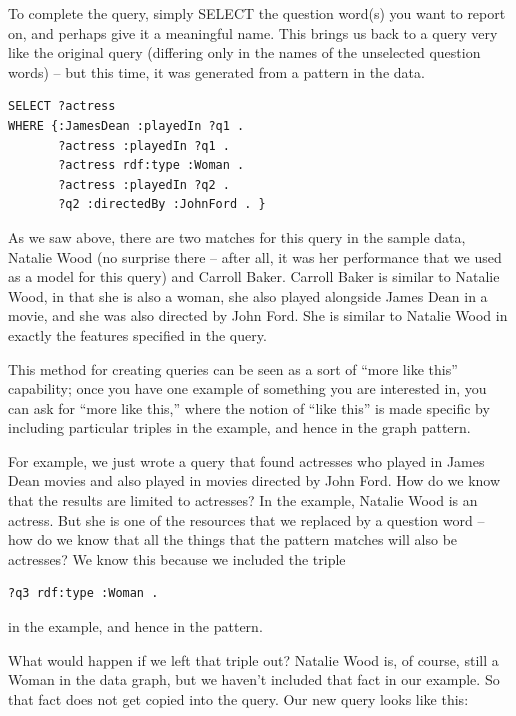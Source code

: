 To complete the query, simply SELECT the question word(s) you want to
report on, and perhaps give it a meaningful name. This brings us back to
a query very like the original query (differing only in the names of the
unselected question words) -- but this time, it was generated from a
pattern in the data.

\begin{lstlisting}
SELECT ?actress
WHERE {:JamesDean :playedIn ?q1 .
       ?actress :playedIn ?q1 .
       ?actress rdf:type :Woman .
       ?actress :playedIn ?q2 .
       ?q2 :directedBy :JohnFord . }
\end{lstlisting}


As we saw above, there are two matches for this query in the sample
data, Natalie Wood (no surprise there -- after all, it was her
performance that we used as a model for this query) and Carroll Baker.
Carroll Baker is similar to Natalie Wood, in that she is also a woman,
she also played alongside James Dean in a movie, and she was also
directed by John Ford. She is similar to Natalie Wood in exactly the
features specified in the query.

This method for creating queries can be seen as a sort of ``more like
this'' capability; once you have one example of something you are
interested in, you can ask for ``more like this,'' where the notion of
``like this'' is made specific by including particular triples in the
example, and hence in the graph pattern.

For example, we just wrote a query that found actresses who played in
James Dean movies and also played in movies directed by John Ford. How
do we know that the results are limited to actresses? In the example,
Natalie Wood is an actress. But she is one of the resources that we
replaced by a question word -- how do we know that all the things that
the pattern matches will also be actresses? We know this because we
included the triple

\begin{lstlisting}
?q3 rdf:type :Woman .
\end{lstlisting}

in the example, and hence in the pattern.

What would happen if we left that triple out? Natalie Wood is, of
course, still a Woman in the data graph, but we haven't included that
fact in our example. So that fact does not get copied into the query.
Our new query looks like this:

